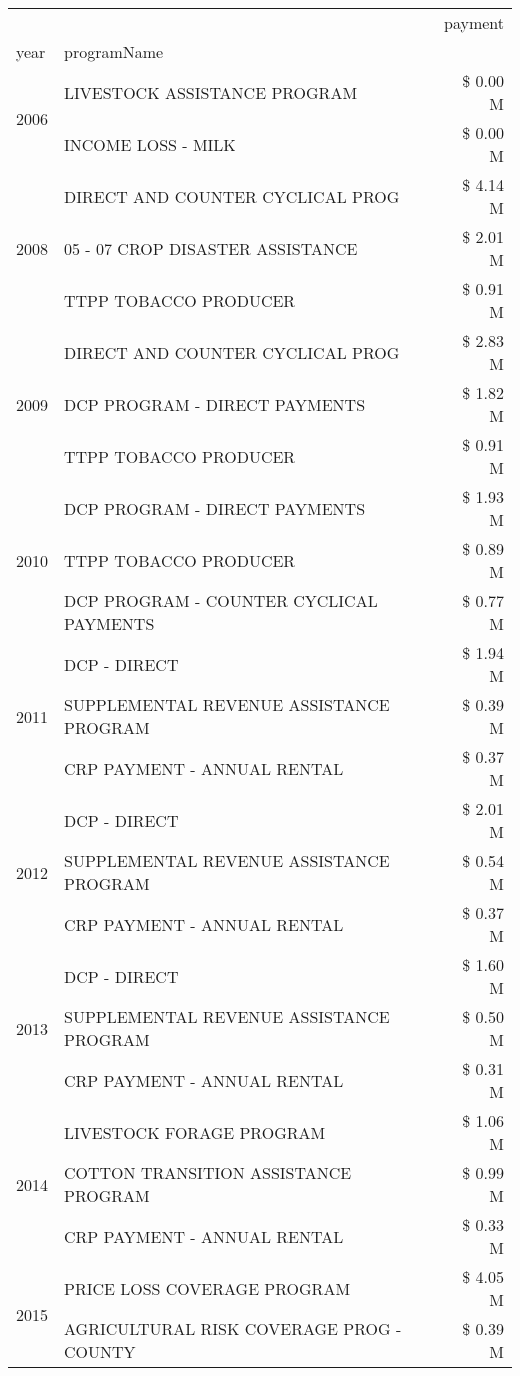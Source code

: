 \begin{tabular}{llr}
\toprule
 &  & payment \\
year & programName &  \\
\midrule
\multirow[t]{2}{*}{2006} & LIVESTOCK ASSISTANCE PROGRAM & \$ 0.00 M \\
 & INCOME LOSS - MILK & \$ 0.00 M \\
\cline{1-3}
\multirow[t]{3}{*}{2008} & DIRECT AND COUNTER CYCLICAL PROG & \$ 4.14 M \\
 & 05 - 07 CROP DISASTER ASSISTANCE & \$ 2.01 M \\
 & TTPP TOBACCO PRODUCER & \$ 0.91 M \\
\cline{1-3}
\multirow[t]{3}{*}{2009} & DIRECT AND COUNTER CYCLICAL PROG & \$ 2.83 M \\
 & DCP PROGRAM - DIRECT PAYMENTS & \$ 1.82 M \\
 & TTPP TOBACCO PRODUCER & \$ 0.91 M \\
\cline{1-3}
\multirow[t]{3}{*}{2010} & DCP PROGRAM - DIRECT PAYMENTS & \$ 1.93 M \\
 & TTPP TOBACCO PRODUCER & \$ 0.89 M \\
 & DCP PROGRAM - COUNTER CYCLICAL PAYMENTS & \$ 0.77 M \\
\cline{1-3}
\multirow[t]{3}{*}{2011} & DCP - DIRECT & \$ 1.94 M \\
 & SUPPLEMENTAL REVENUE ASSISTANCE PROGRAM & \$ 0.39 M \\
 & CRP PAYMENT - ANNUAL RENTAL & \$ 0.37 M \\
\cline{1-3}
\multirow[t]{3}{*}{2012} & DCP - DIRECT & \$ 2.01 M \\
 & SUPPLEMENTAL REVENUE ASSISTANCE PROGRAM & \$ 0.54 M \\
 & CRP PAYMENT - ANNUAL RENTAL & \$ 0.37 M \\
\cline{1-3}
\multirow[t]{3}{*}{2013} & DCP - DIRECT & \$ 1.60 M \\
 & SUPPLEMENTAL REVENUE ASSISTANCE PROGRAM & \$ 0.50 M \\
 & CRP PAYMENT - ANNUAL RENTAL & \$ 0.31 M \\
\cline{1-3}
\multirow[t]{3}{*}{2014} & LIVESTOCK FORAGE PROGRAM & \$ 1.06 M \\
 & COTTON TRANSITION ASSISTANCE PROGRAM & \$ 0.99 M \\
 & CRP PAYMENT - ANNUAL RENTAL & \$ 0.33 M \\
\cline{1-3}
\multirow[t]{3}{*}{2015} & PRICE LOSS COVERAGE PROGRAM & \$ 4.05 M \\
 & AGRICULTURAL RISK COVERAGE PROG - COUNTY & \$ 0.39 M \\

\end{tabular}
